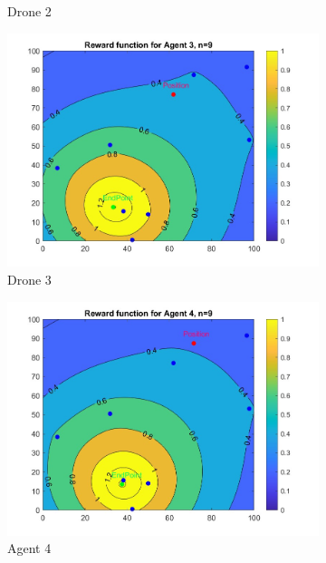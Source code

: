 \begin{figure}[h]
\begin{subfigure}[b]{0.3\textwidth}
         \caption{Drone 2}
         \label{fig:r2}
     \end{subfigure}
     \hfill
     \begin{subfigure}[b]{0.3\textwidth}
         \centering
         \includegraphics[width=\textwidth]{figures/RewardFunction3.jpg}
         \caption{Drone 3}
         \label{fig:r3}
     \end{subfigure}
        \begin{subfigure}[b]{0.3\textwidth}
         \centering
         \includegraphics[width=\textwidth]{figures/RewardFunction4.jpg}
         \caption{Agent 4}
         \label{fig:r4}
     \end{subfigure}
     \hfill
     \begin{subfigure}[b]{0.3\textwidth}

\end{subfigure}
\end{figure}
